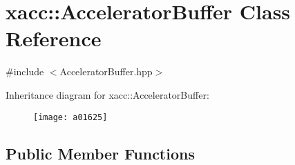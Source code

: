 \hypertarget{a01625}{}\section{xacc\+:\+:Accelerator\+Buffer Class Reference}
\label{a01625}


{\ttfamily \#include $<$Accelerator\+Buffer.\+hpp$>$}

Inheritance diagram for xacc\+:\+:Accelerator\+Buffer\+:\begin{figure}[H]
\begin{center}
\leavevmode
\texttt{[image: a01625]}
\end{center}
\end{figure}
\subsection*{Public Member Functions}
